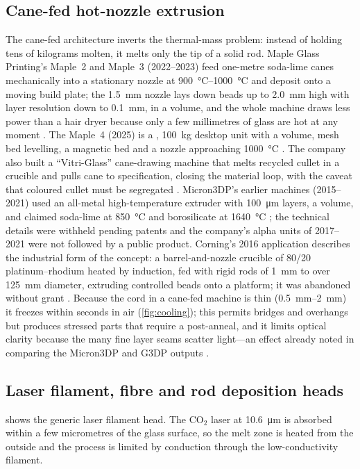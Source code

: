 \subsection{Cane-fed hot-nozzle extrusion}
The cane-fed architecture inverts the thermal-mass problem: instead of holding tens of kilograms molten, it melts only the tip of a solid rod. Maple Glass Printing's Maple~2 and Maple~3 (2022--2023) feed one-metre soda-lime canes mechanically into a stationary nozzle at \SIrange{900}{1000}{\celsius} and deposit onto a moving build plate; the \SI{1.5}{mm} nozzle lays down beads up to \SI{2.0}{mm} high with layer resolution down to \SI{0.1}{mm}, in a  volume, and the whole machine draws less power than a hair dryer because only a few millimetres of glass are hot at any moment \citep{maple_ammedia,maple_aniwaa,threednatives2025}. The Maple~4 (2025) is a , \SI{100}{kg} desktop unit with a  volume, mesh bed levelling, a magnetic bed and a nozzle approaching \SI{1000}{\celsius} \citep{threednatives2025,maple_web}. The company also built a ``Vitri-Glass'' cane-drawing machine that melts recycled cullet in a crucible and pulls cane to specification, closing the material loop, with the caveat that coloured cullet must be segregated \citep{maple_ammedia}. Micron3DP's earlier machines (2015--2021) used an all-metal high-temperature extruder with \SI{100}{\micro\metre} layers, a  volume, and claimed soda-lime at \SI{850}{\celsius} and borosilicate at \SI{1640}{\celsius} \citep{micron3dp_acers,micron3dp_3dprint2017}; the technical details were withheld pending patents and the company's alpha units of 2017--2021 were not followed by a public product. Corning's 2016 application describes the industrial form of the concept: a barrel-and-nozzle crucible of 80/20 platinum--rhodium heated by induction, fed with rigid rods of \SI{1}{mm} to over \SI{125}{mm} diameter, extruding controlled beads onto a platform; it was abandoned without grant \citep{patent_corning2021}. Because the cord in a cane-fed machine is thin (\SIrange{0.5}{2}{mm}) it freezes within seconds in air (\cref{fig:cooling}); this permits bridges and overhangs but produces stressed parts that require a post-anneal, and it limits optical clarity because the many fine layer seams scatter light---an effect already noted in comparing the Micron3DP and G3DP outputs \citep{inamura2018}.

\subsection{Laser filament, fibre and rod deposition heads}
 shows the generic laser filament head. The CO$_2$ laser at \SI{10.6}{\micro\metre} is absorbed within a few micrometres of the glass surface, so the melt zone is heated from the outside and the process is limited by conduction through the low-conductivity filament.

